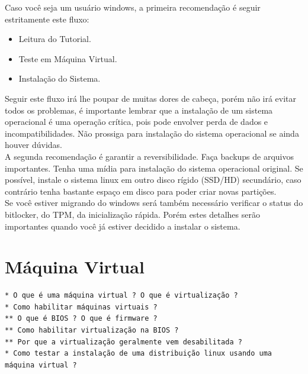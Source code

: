 \documentclass[12pt,a4paper]{article}
\begin{document}
\hspace{\baselineskip}

Caso você seja um usuário windows, a primeira recomendação é seguir estritamente este fluxo:

\begin{itemize}
\item[1.] Leitura do Tutorial.
\item[2.] Teste em Máquina Virtual.
\item[3.] Instalação do Sistema.
\end{itemize}

Seguir este fluxo irá lhe poupar de muitas dores de cabeça, porém não irá evitar todos os problemas, é importante lembrar que a instalação de um sistema operacional é uma operação crítica, pois pode envolver perda de dados e incompatibilidades. Não prossiga para instalação do sistema operacional se ainda houver dúvidas. \\

A segunda recomendação é garantir a reversibilidade. Faça backups de arquivos importantes. Tenha uma mídia para instalação do sistema operacional original. Se possível, instale o sistema linux em outro disco rígido (SSD/HD) secundário, caso contrário tenha bastante espaço em disco para poder criar novas partições. \\

Se você estiver migrando do windows será também necessário verificar o status do bitlocker, do TPM, da inicialização rápida. Porém estes detalhes serão importantes quando você já estiver decidido a instalar o sistema.\\


\section*{Máquina Virtual}


\begin{lstlisting}
* O que é uma máquina virtual ? O que é virtualização ?
* Como habilitar máquinas virtuais ?
** O que é BIOS ? O que é firmware ?
** Como habilitar virtualização na BIOS ?
** Por que a virtualização geralmente vem desabilitada ? 
* Como testar a instalação de uma distribuição linux usando uma máquina virtual ? 
\end{lstlisting}
\end{document}

